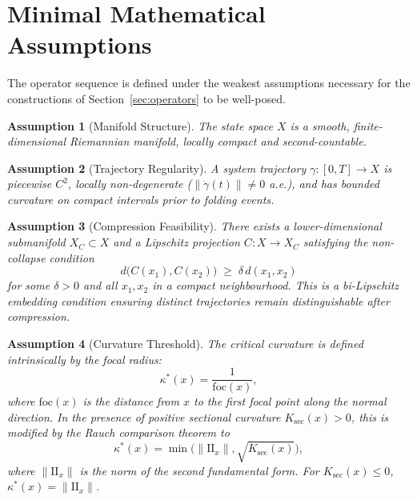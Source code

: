 \documentclass[12pt,a4paper]{article}
\newtheorem{assumption}{Assumption}[section]
\begin{document}
\section{Minimal Mathematical Assumptions}
\label{sec:assumptions}

The operator sequence is defined under the weakest assumptions
necessary for the constructions of Section~\ref{sec:operators} to
be well-posed.

\begin{assumption}[Manifold Structure]
\label{ass:manifold}
The state space $X$ is a smooth, finite-dimensional Riemannian
manifold, locally compact and second-countable.
\end{assumption}

\begin{assumption}[Trajectory Regularity]
\label{ass:trajectory}
A system trajectory $\gamma : [0,T] \to X$ is piecewise $C^2$,
locally non-degenerate ($\|\dot\gamma(t)\| \neq 0$ a.e.), and has
bounded curvature on compact intervals prior to folding events.
\end{assumption}

\begin{assumption}[Compression Feasibility]
\label{ass:compression}
There exists a lower-dimensional submanifold $X_C \subset X$ and a
Lipschitz projection $C : X \to X_C$ satisfying the non-collapse
condition
\[
  d\bigl(C(x_1), C(x_2)\bigr) \;\geq\; \delta\, d(x_1, x_2)
\]
for some $\delta > 0$ and all $x_1, x_2$ in a compact neighbourhood.
This is a bi-Lipschitz embedding condition ensuring distinct
trajectories remain distinguishable after compression.
\end{assumption}

\begin{assumption}[Curvature Threshold]
\label{ass:kappa}
The critical curvature is defined intrinsically by the focal radius:
\[
  \kappa^*(x) = \frac{1}{\mathrm{foc}(x)},
\]
where $\mathrm{foc}(x)$ is the distance from $x$ to the first focal
point along the normal direction.
In the presence of positive sectional curvature $K_\mathrm{sec}(x) > 0$,
this is modified by the Rauch comparison theorem to
\[
  \kappa^*(x) = \min\!\bigl(\|\mathrm{II}_x\|,
    \sqrt{K_\mathrm{sec}(x)}\bigr),
\]
where $\|\mathrm{II}_x\|$ is the norm of the second fundamental form.
For $K_\mathrm{sec}(x) \leq 0$, $\kappa^*(x) = \|\mathrm{II}_x\|$.
\end{assumption}
\end{document}
